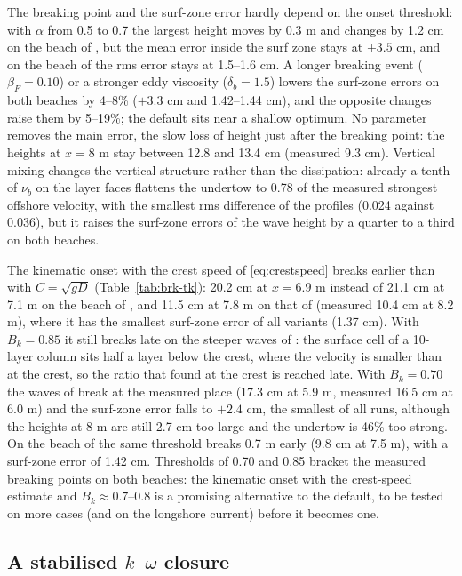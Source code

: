 The breaking point and the surf-zone error hardly depend on the onset
threshold: with $\alpha$ from 0.5 to 0.7 the largest height moves by 0.3 m
and changes by 1.2 cm on the beach of \citet{ting1994}, but the mean error
inside the surf zone stays at $+3.5$ cm, and on the beach of
\citet{hansen1979} the rms error stays at 1.5--1.6 cm. A longer breaking
event ($\beta_F = 0.10$) or a stronger eddy viscosity ($\delta_b = 1.5$)
lowers the surf-zone errors on both beaches by 4--8\% ($+3.3$ cm and 1.42--1.44
cm), and the opposite changes raise them by 5--19\%; the default sits near
a shallow optimum. No parameter removes the main error,
the slow loss of height just after the breaking point: the heights at
$x = 8$ m stay between 12.8 and 13.4 cm (measured 9.3 cm). Vertical mixing
changes the vertical structure rather than the dissipation: already a
tenth of $\nu_b$ on the layer faces flattens the undertow to 0.78 of the
measured strongest offshore velocity, with the smallest rms difference of
the profiles (0.024 against 0.036), but it raises the surf-zone errors of
the wave height by a quarter to a third on both beaches.

The kinematic onset with the crest speed of \eqref{eq:crestspeed} breaks
earlier than with $C = \sqrt{gD}$ (Table~\ref{tab:brk-tk}): 20.2 cm at
$x = 6.9$ m instead of 21.1 cm at 7.1 m on the beach of \citet{ting1994},
and 11.5 cm at 7.8 m on that of \citet{hansen1979} (measured 10.4 cm at
8.2 m), where it has the smallest surf-zone error of all variants (1.37
cm). With $B_k = 0.85$ it still breaks late on the steeper waves of
\citet{ting1994}: the surface cell of a 10-layer column sits half a layer
below the crest, where the velocity is smaller than at the crest, so the
ratio that \citet{barthelemy2018} found at the crest is reached late.
With $B_k = 0.70$ the waves of \citet{ting1994} break at the measured place
(17.3 cm at 5.9 m, measured 16.5 cm at 6.0 m) and the surf-zone error falls
to $+2.4$ cm, the smallest of all runs, although the heights at 8 m are
still 2.7 cm too large and the undertow is 46\% too strong. On the beach of
\citet{hansen1979} the same threshold breaks 0.7 m early (9.8 cm at 7.5 m),
with a surf-zone error of 1.42 cm. Thresholds of 0.70 and 0.85 bracket the
measured breaking points on both beaches: the kinematic onset with the
crest-speed estimate and $B_k \approx 0.7$--0.8 is a promising alternative
to the default, to be tested on more cases (and on the longshore current)
before it becomes one.

\subsection{A stabilised \texorpdfstring{$k$--$\omega$}{k-omega} closure}
\label{sec:brk-kw}

